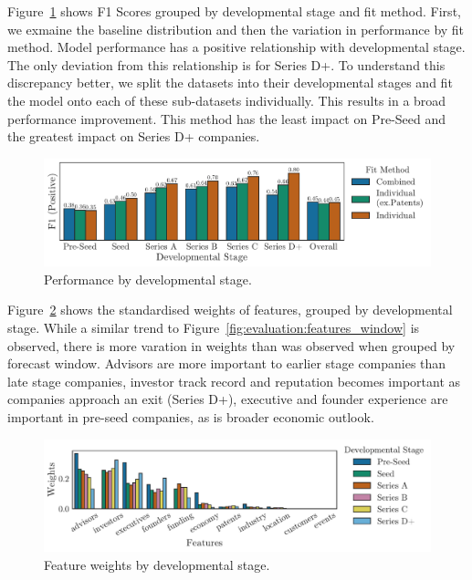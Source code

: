 \documentclass[../thesis/thesis.tex]{subfiles}
\begin{document}
Figure~\ref{fig:evaluation:performance_stage} shows F1 Scores grouped by developmental stage and fit method. First, we exmaine the baseline distribution and then the variation in performance by fit method. Model performance has a positive relationship with developmental stage. The only deviation from this relationship is for Series D+. To understand this discrepancy better, we split the datasets into their developmental stages and fit the model onto each of these sub-datasets individually. This results in a broad performance improvement. This method has the least impact on Pre-Seed and the greatest impact on Series D+ companies.

\begin{figure}[!htb]
    \centering
    \includegraphics[width=\textwidth]{../figures/evaluation/performance_stage}
    \caption[Performance by developmental stage]{Performance by developmental stage.}
    \label{fig:evaluation:performance_stage}
\end{figure}

Figure~\ref{fig:evaluation:features_stage} shows the standardised weights of features, grouped by developmental stage. While a similar trend to Figure~\ref{fig:evaluation:features_window} is observed, there is more varation in weights than was observed when grouped by forecast window. Advisors are more important to earlier stage companies than late stage companies, investor track record and reputation becomes important as companies approach an exit (Series D+), executive and founder experience are important in pre-seed companies, as is broader economic outlook.

\begin{figure}[!htb]
    \centering
    \includegraphics[width=\textwidth]{../figures/evaluation/features_stage}
    \caption[Feature weights by developmental stage]{Feature weights by developmental stage.}
    \label{fig:evaluation:features_stage}
\end{figure}
\end{document}
